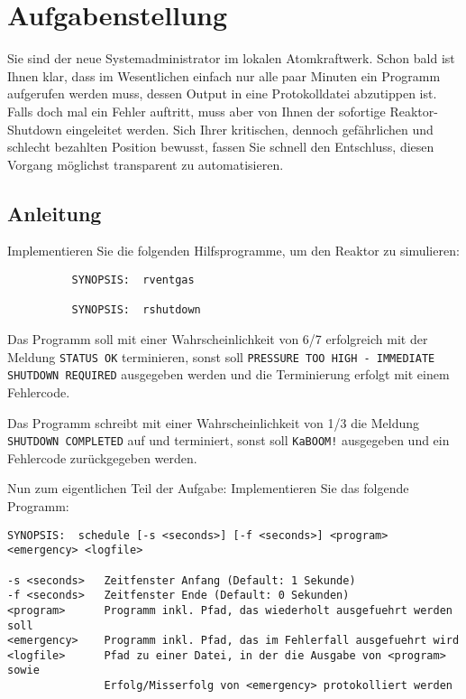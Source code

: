 




\section*{Aufgabenstellung}

Sie sind der neue Systemadministrator im lokalen Atomkraftwerk. Schon bald ist
Ihnen klar, dass im Wesentlichen einfach nur alle paar Minuten ein Programm
aufgerufen werden muss, dessen Output in eine Protokolldatei abzutippen ist.
Falls doch mal ein Fehler auftritt, muss aber von Ihnen der sofortige
Reaktor-Shutdown eingeleitet werden. Sich Ihrer kritischen, dennoch gefährlichen
und schlecht bezahlten Position bewusst, fassen Sie schnell den Entschluss,
diesen Vorgang möglichst transparent zu automatisieren.

\subsection*{Anleitung}
Implementieren Sie die folgenden Hilfsprogramme, um den Reaktor zu simulieren:

\begin{verbatim}
          SYNOPSIS:  rventgas

          SYNOPSIS:  rshutdown
\end{verbatim}

Das Programm  soll mit einer Wahrscheinlichkeit von 6/7
erfolgreich mit der Meldung \verb_STATUS OK_ terminieren, sonst soll
\verb_PRESSURE TOO HIGH - IMMEDIATE SHUTDOWN REQUIRED_ ausgegeben werden und die
Terminierung erfolgt mit einem Fehlercode.

Das Programm  schreibt mit einer Wahrscheinlichkeit von 1/3 die
Meldung\\
\verb_SHUTDOWN COMPLETED_ auf  und terminiert, sonst soll
\verb_KaBOOM!_ ausgegeben und ein Fehlercode zurückgegeben werden.

Nun zum eigentlichen Teil der Aufgabe: Implementieren Sie das folgende Programm:

\begin{verbatim}
SYNOPSIS:  schedule [-s <seconds>] [-f <seconds>] <program> <emergency> <logfile>

-s <seconds>   Zeitfenster Anfang (Default: 1 Sekunde)
-f <seconds>   Zeitfenster Ende (Default: 0 Sekunden)
<program>      Programm inkl. Pfad, das wiederholt ausgefuehrt werden soll
<emergency>    Programm inkl. Pfad, das im Fehlerfall ausgefuehrt wird
<logfile>      Pfad zu einer Datei, in der die Ausgabe von <program> sowie
               Erfolg/Misserfolg von <emergency> protokolliert werden
\end{verbatim}

